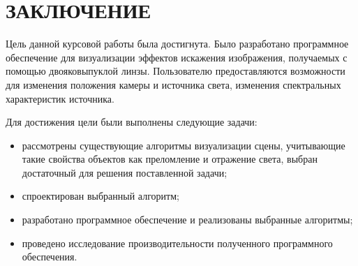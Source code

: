 \section*{ЗАКЛЮЧЕНИЕ}

Цель данной курсовой работы была достигнута. Было разработано программное обеспечение для визуализации эффектов искажения изображения, получаемых с помощью двояковыпуклой линзы. Пользователю предоставляются возможности для изменения положения камеры и источника света, изменения спектральных характеристик источника.

Для достижения цели были выполнены следующие задачи:

\begin{itemize}
	\item рассмотрены существующие алгоритмы визуализации сцены, учитывающие такие свойства объектов как преломление и отражение света, выбран достаточный для решения поставленной задачи;
	\item спроектирован выбранный алгоритм;
	\item разработано программное обеспечение и реализованы выбранные алгоритмы;
	\item проведено исследование производительности полученного программного обеспечения.
\end{itemize}
